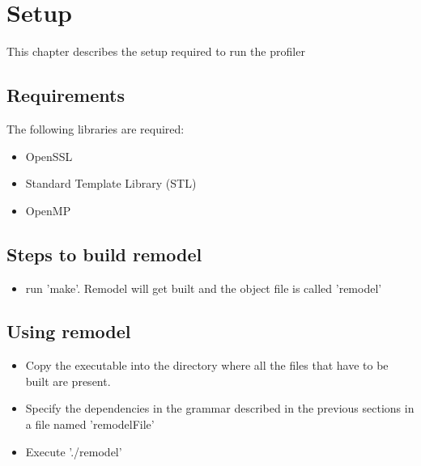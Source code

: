\documentclass[a4paper, 12pt, notitlepage]{report}
\begin{document}
\chapter{Setup}
%
This chapter describes the setup required to run the profiler
\section{Requirements}
The following libraries are required:
\begin{itemize}
\item OpenSSL
\item Standard Template Library (STL)
\item OpenMP
\end{itemize}

\section{Steps to build remodel}
\begin{itemize}
\item run 'make'. Remodel will get built and the object file is called 'remodel'
\end{itemize}

\section{Using remodel}
\begin{itemize}
\item Copy the executable into the directory where all the files that have to be built are present.
\item Specify the dependencies in the grammar described in the previous sections in a file named 'remodelFile' 
\item Execute './remodel'
\end{itemize}
\end{document}
